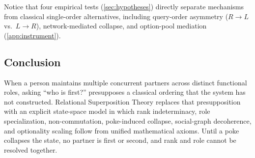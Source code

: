 \noindent\layerbehav{} \layerempiric{} Notice that four empirical tests (\cref{sec:hypotheses})
directly separate \RST{} mechanisms from classical single-order alternatives, including
query-order asymmetry ($R\to L$ vs.\ $L\to R$), network-mediated collapse, and option-pool
mediation (\cref{app:instrument}).

\subsection{Conclusion}
\label{subsec:disc-conclusion}

When a person maintains multiple concurrent partners across distinct functional
roles, asking ``who is first?'' presupposes a classical ordering that the
system has not constructed. Relational Superposition Theory replaces that
presupposition with an explicit state-space model in which rank indeterminacy,
role specialization, non-commutation, poke-induced collapse, social-graph
decoherence, and optionality scaling follow from unified mathematical axioms.
Until a poke collapses the state, no partner is first or second, and rank and
role cannot be resolved together.
